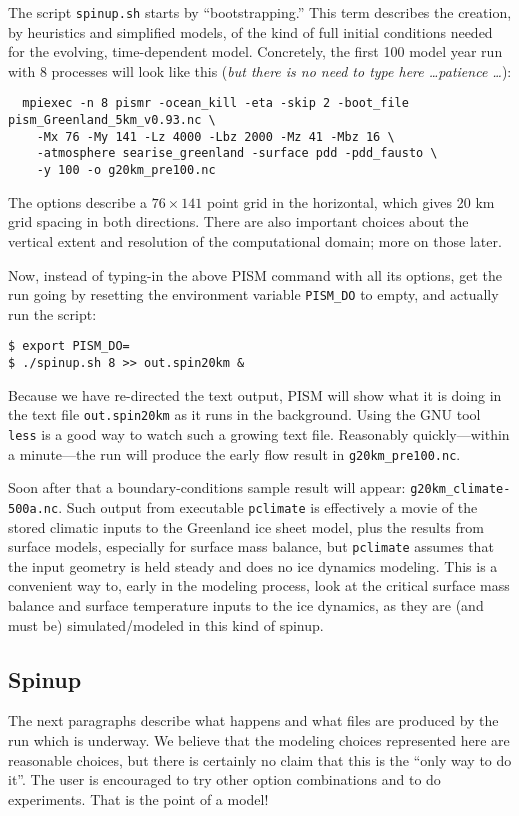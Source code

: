 The script \texttt{spinup.sh} starts by ``bootstrapping.''  This term describes the creation, by heuristics and simplified models, of the kind of full initial conditions needed for the evolving, time-dependent model.  Concretely, the first 100 model year run with 8 processes will look like this (\emph{but there is no need to type here \dots patience \dots}):
\small
\begin{verbatim}
  mpiexec -n 8 pismr -ocean_kill -eta -skip 2 -boot_file pism_Greenland_5km_v0.93.nc \
    -Mx 76 -My 141 -Lz 4000 -Lbz 2000 -Mz 41 -Mbz 16 \
    -atmosphere searise_greenland -surface pdd -pdd_fausto \
    -y 100 -o g20km_pre100.nc
\end{verbatim}
\normalsize
The options describe a $76\times 141$ point grid in the horizontal, which gives 20 km grid spacing in both directions.  There are also important choices about the vertical extent and resolution of the computational domain; more on those later.  

Now, instead of typing-in the above PISM command with all its options, get the run going by resetting the environment variable \texttt{PISM_DO} to empty, and actually run the script:
\begin{verbatim}
$ export PISM_DO=
$ ./spinup.sh 8 >> out.spin20km &
\end{verbatim}
\noindent Because we have re-directed the text output, PISM will show what it is doing in the text file \texttt{out.spin20km} as it runs in the background.  Using the GNU tool \texttt{less} is a good way to watch such a growing text file.  Reasonably quickly---within a minute---the run will produce the early flow result in \texttt{g20km_pre100.nc}.

Soon after that a boundary-conditions sample result will appear: \texttt{g20km_climate-500a.nc}.  Such output from executable \texttt{pclimate} is effectively a movie of the stored climatic inputs to the Greenland ice sheet model, plus the results from surface models, especially for surface mass balance, but \texttt{pclimate} assumes that the input geometry is held steady and does no ice dynamics modeling.  This is a convenient way to, early in the modeling process, look at the critical surface mass balance and surface temperature inputs to the ice dynamics, as they are (and must be) simulated/modeled in this kind of spinup.

\subsection{Spinup}  \label{subsect:spinupsketch}  The next paragraphs describe what happens and what files are produced by the run which is underway.  We believe that the modeling choices represented here are reasonable choices, but there is certainly no claim that this is the ``only way to do it''.  The user is encouraged to try other option combinations and to do experiments.  That is the point of a model!

